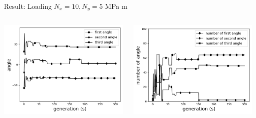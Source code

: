 \documentclass{beamer}
\begin{document}
\begin{frame}{Result: Loading $N_x = 10, N_y=5 $ MPa m}
\begin{columns}
\begin{column}{0.5\textwidth}
        \begin{center}
              \includegraphics[width=1.0\linewidth]{2020-11-10-pre-image/three_distinct_angles_angle_change.png}
        \end{center}
    \end{column}
    \begin{column}{0.5\textwidth}
        \begin{center}
              \includegraphics[width=1.0\linewidth]{2020-11-10-pre-image/three_distinct_angle_number_of_angle.png}
        \end{center}
    \end{column}
\end{columns}
\end{frame}
\end{document}
